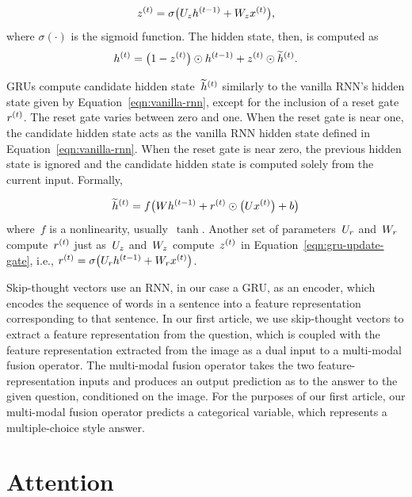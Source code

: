 \begin{equation}
z^{(t)} = \sigma\big(U_zh^{(t - 1)} + W_zx^{(t)}\big),
\label{eqn:gru-update-gate}
\end{equation}
where $\sigma(\cdot)$ is the sigmoid function.
The hidden state, then, is computed as
\begin{equation}
h^{(t)} = \big(1 - z^{(t)}\big) \odot h^{(t - 1)} + z^{(t)} \odot \widetilde{h}^{(t)}.
\label{eqn:gru-update}
\end{equation}

GRUs compute candidate hidden state~$\widetilde{h}^{(t)}$ similarly to
the vanilla RNN's hidden state given by Equation~\ref{eqn:vanilla-rnn},
except for the inclusion of a reset gate~$r^{(t)}$.
The reset gate varies between zero and one.
When the reset gate is near one, the candidate hidden state acts as the vanilla
RNN hidden state defined in Equation~\ref{eqn:vanilla-rnn}.
When the reset gate is near zero, the previous hidden state is ignored and the
candidate hidden state is computed solely from the current input.
Formally,

\begin{equation}
\widetilde{h}^{(t)} = f\big(Wh^{(t - 1)} + r^{(t)}\odot\big(Ux^{(t)}\big) + b\big)
\end{equation}
where~$f$ is a nonlinearity, usually~$\tanh$.
Another set of parameters~$U_r$ and~$W_r$ compute~$r^{(t)}$
just as~$U_z$ and~$W_z$ compute~$z^{(t)}$ in
Equation~\ref{eqn:gru-update-gate}, i.e.,
$r^{(t)} = \sigma\big(U_rh^{(t - 1)} + W_rx^{(t)}\big)$.

Skip-thought vectors use an RNN, in our case a GRU, as an encoder, which
encodes the sequence of words in a sentence into a feature representation
corresponding to that sentence.
In our first article, we use skip-thought vectors to extract a feature
representation from the question, which is coupled with the feature
representation extracted from the image as a dual input to a multi-modal fusion
operator.
The multi-modal fusion operator takes the two feature-representation inputs and
produces an output prediction as to the answer to the given question,
conditioned on the image.
For the purposes of our first article, our multi-modal fusion operator predicts
a categorical variable, which represents a multiple-choice style answer.


\section{Attention}

